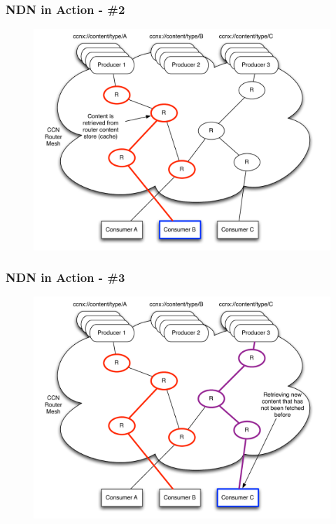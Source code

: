 \documentclass[handout]{beamer}
\begin{document}
\begin{frame}
	\frametitle{NDN in Action - \#2}
	\begin{figure}[h]
		\includegraphics[scale=0.4]{img/ccn_img2.pdf}
	\end{figure}
\end{frame}

\begin{frame}
	\frametitle{NDN in Action - \#3}
	\begin{figure}[h]
		\includegraphics[scale=0.4]{img/ccn_img3.pdf}
	\end{figure}
\end{frame}
\end{document}
